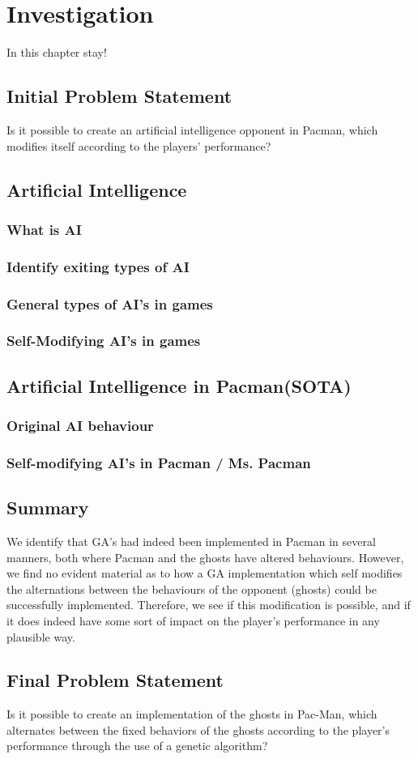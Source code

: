 \section{Investigation} \label{sec:preanalysus}
In this chapter 
stay!


\subsection{Initial Problem Statement} \label{sec:initialproblemstatement}
Is it possible to create an artificial intelligence opponent in Pacman, which modifies itself according to the players' performance?


\subsection{Artificial Intelligence} \label{sec:ai}
\subsubsection{What is AI}

\subsubsection{Identify exiting types of AI}
\subsubsection{General types of AI's in games}
\subsubsection{Self-Modifying AI's in games}


\subsection{Artificial Intelligence in Pacman(SOTA)}
\subsubsection{Original AI behaviour}
\subsubsection{Self-modifying AI's in Pacman / Ms. Pacman}

\subsection{Summary}
We identify that GA’s had indeed been implemented in Pacman in several manners, both where Pacman and the ghosts have altered behaviours. However, we find no evident material as to how a GA implementation which self modifies the alternations between the behaviours of the opponent (ghosts) could be successfully implemented. Therefore, we see if this modification is possible, and if it does indeed have some sort of impact on the player’s performance in any plausible way.


\subsection{Final Problem Statement} \label{sec:finalproblemstatement}
Is it possible to create an implementation of the ghosts in Pac-Man, which alternates between the fixed behaviors of the ghosts according to the player's performance through the use of a genetic algorithm?